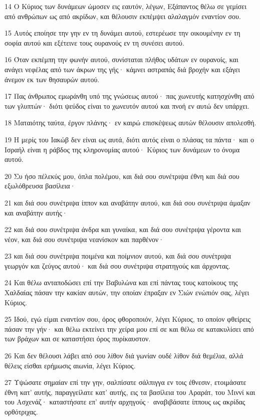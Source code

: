 \par 14 Ο Κύριος των δυνάμεων ώμοσεν εις εαυτόν, λέγων, Εξάπαντος θέλω σε γεμίσει από ανθρώπων ως από ακρίδων, και θέλουσιν εκπέμψει αλαλαγμόν εναντίον σου.
\par 15 Αυτός εποίησε την γην εν τη δυνάμει αυτού, εστερέωσε την οικουμένην εν τη σοφία αυτού και εξέτεινε τους ουρανούς εν τη συνέσει αυτού.
\par 16 Όταν εκπέμπη την φωνήν αυτού, συνίσταται πλήθος υδάτων εν ουρανοίς, και ανάγει νεφέλας από των άκρων της γής· κάμνει αστραπάς διά βροχήν και εξάγει άνεμον εκ των θησαυρών αυτού.
\par 17 Πας άνθρωπος εμωράνθη υπό της γνώσεως αυτού· πας χωνευτής κατησχύνθη από των γλυπτών· διότι ψεύδος είναι το χωνευτόν αυτού και πνοή εν αυτώ δεν υπάρχει.
\par 18 Ματαιότης ταύτα, έργον πλάνης· εν καιρώ επισκέψεως αυτών θέλουσιν απολεσθή.
\par 19 Η μερίς του Ιακώβ δεν είναι ως αυτά, διότι αυτός είναι ο πλάσας τα πάντα· και ο Ισραήλ είναι η ράβδος της κληρονομίας αυτού· Κύριος των δυνάμεων το όνομα αυτού.
\par 20 Συ ήσο πέλεκύς μου, όπλα πολέμου, και διά σου συνέτριψα έθνη και διά σου εξωλόθρευσα βασίλεια·
\par 21 και διά σου συνέτριψα ίππον και αναβάτην αυτού, και διά σου συνέτριψα άμαξαν και αναβάτην αυτής·
\par 22 και διά σου συνέτριψα άνδρα και γυναίκα, και διά σου συνέτριψα γέροντα και νέον, και διά σου συνέτριψα νεανίσκον και παρθένον·
\par 23 και διά σου συνέτριψα ποιμένα και ποίμνιον αυτού, και διά σου συνέτριψα γεωργόν και ζεύγος αυτού· και διά σου συνέτριψα στρατηγούς και άρχοντας.
\par 24 Και θέλω ανταποδώσει επί την Βαβυλώνα και επί πάντας τους κατοίκους της Χαλδαίας πάσαν την κακίαν αυτών, την οποίαν έπραξαν εν Σιών ενώπιόν σας, λέγει Κύριος.
\par 25 Ιδού, εγώ είμαι εναντίον σου, όρος φθοροποιόν, λέγει Κύριος, το οποίον φθείρεις πάσαν την γήν· και θέλω εκτείνει την χείρα μου επί σε και θέλω σε κατακυλίσει από των βράχων και σε καταστήσει όρος πυρίκαυστον.
\par 26 Και δεν θέλουσι λάβει από σου λίθον διά γωνίαν ουδέ λίθον διά θεμέλια, αλλά θέλεις είσθαι ερήμωσις αιωνία, λέγει Κύριος.
\par 27 Υψώσατε σημαίαν επί την γην, σαλπίσατε σάλπιγγα εν τοις έθνεσιν, ετοιμάσατε έθνη κατ' αυτής, παραγγείλατε κατ' αυτής, εις τα βασίλεια του Αραράτ, του Μιννί και του Ασχενάζ· καταστήσατε επ' αυτήν αρχηγούς· αναβιβάσατε ίππους ως ακρίδας ορθότριχας.
